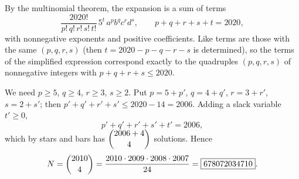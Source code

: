 By the multinomial theorem, the expansion is a sum of terms
\[\dfrac{2020!}{p!\,q!\,r!\,s!\,t!}\,5^t\,a^pb^qc^rd^s,\qquad p+q+r+s+t=2020,\]
with nonnegative exponents and positive coefficients. Like terms are those with the same $(p,q,r,s)$ (then $t=2020-p-q-r-s$ is determined), so the terms of the simplified expression correspond exactly to the quadruples $(p,q,r,s)$ of nonnegative integers with $p+q+r+s\le2020$.

We need $p\ge5$, $q\ge4$, $r\ge3$, $s\ge2$. Put $p=5+p'$, $q=4+q'$, $r=3+r'$, $s=2+s'$; then $p'+q'+r'+s'\le2020-14=2006$. Adding a slack variable $t'\ge0$,
\[p'+q'+r'+s'+t'=2006,\]
which by stars and bars has $\dbinom{2006+4}{4}$ solutions. Hence
\[N=\dbinom{2010}{4}=\dfrac{2010\cdot2009\cdot2008\cdot2007}{24}=\boxed{678072034710}.\]
